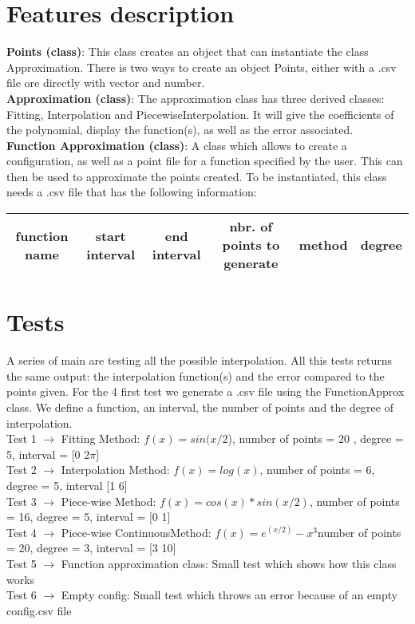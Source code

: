\documentclass[12pt]{article}
\begin{document}
\section{Features description}
\textbf{Points (class)}: This class creates an object that can instantiate the class Approximation. There is two ways to create an object Points, either with a .csv file ore directly with vector and number.\\
\textbf{Approximation (class)}: The approximation class has three derived classes: Fitting, Interpolation and PiecewiseInterpolation. It will give the coefficients of the polynomial, display the function(s), as well as the error associated.\\
\textbf{Function Approximation (class)}: A class which allows to create a configuration, as well as a point file for a function specified by the user. This can then be used to approximate the points created. To be instantiated, this class needs a .csv file that has the following information:
\begin{center}
\begin{tabular}{|c|c|c|c|c|c|}
\hline
function name & start interval & end interval & nbr. of points to generate & method  & degree \\
\hline
\end{tabular} 
\end{center}

\section{Tests}
A series of main are testing all the possible interpolation. All this tests returns the same output: the interpolation function(s) and the error compared to the points given. For the 4 first test we generate a .csv file using the FunctionApprox class. We define a function, an interval, the number of points and the degree of interpolation.\\
Test 1 $\rightarrow$ Fitting Method: $f(x) = sin(x/2$), number of points =  20 , degree = 5, interval = [0 2$\pi$] \\
Test 2 $\rightarrow$ Interpolation Method: $f(x) = log(x)$, number of points = 6, degree = 5, interval [1 6] \\
Test 3 $\rightarrow$ Piece-wise Method: $f(x) = cos(x)*sin(x/2)$, number of points = 16, degree = 5, interval = [0 1] \\
Test 4 $\rightarrow$ Piece-wise ContinuousMethod: $f(x) = e^{(x/2)} -x^3$number of points = 20, degree = 3, interval = [3 10] \\
Test 5 $\rightarrow$ Function approximation class: Small test which shows how this class works\\
Test 6 $\rightarrow$ Empty config: Small test which throws an error because of an empty config.csv file\\
\end{document}
